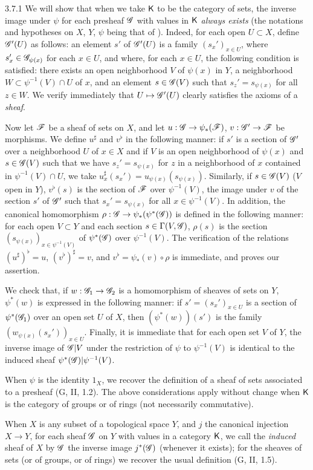 \begin{env}{3.7.1}
\label{env-0.3.7.1}
We will show that when we take $\mathsf{K}$ to be the category of sets, the inverse
image under $\psi$ for each presheaf $\mathscr{G}$ with values in $\mathsf{K}$ \emph{always
exists} (the notations and hypotheses on $X$, $Y$, $\psi$ being that of
). Indeed, for each open $U\subset X$, define $\mathscr{G}'(U)$ as
follows: an element $s'$ of $\mathscr{G}'(U)$ is a family $(s_x')_{x\in U}$, where
$s_x'\in\mathscr{G}_{\psi(x)}$ for each $x\in U$, and where, for each $x\in U$, the
following condition is satisfied: there exists an open neighborhood $V$ of
$\psi(x)$ in $Y$, a neighborhood $W\subset\psi^{-1}(V)\cap U$ of $x$, and an
element $s\in\mathscr{G}(V)$ such that $s_z'=s_{\psi(x)}$ for all $z\in W$. We verify
immediately that $U\mapsto\mathscr{G}'(U)$ clearly satisfies the axioms of a
\emph{sheaf}.

Now let $\mathscr{F}$ be a sheaf of sets on $X$, and let $u:\mathscr{G}\to\psi_*(\mathscr{F})$,
$v:\mathscr{G}'\to\mathscr{F}$ be morphisms. We define $u^\sharp$ and $v^\flat$ in the
following manner: if $s'$ is a section of $\mathscr{G}'$ over a neighborhood $U$ of
$x\in X$ and if $V$ is an open neighborhood of $\psi(x)$ and $s\in\mathscr{G}(V)$
such that we have $s_z'=s_{\psi(x)}$ for $z$ in a neighborhood of $x$ contained
in $\psi^{-1}(V)\cap U$, we take $u_x^\sharp(s_x')=u_{\psi(x)}(s_{\psi(x)})$.
Similarly, if $s\in\mathscr{G}(V)$ ($V$ open in $Y$), $v^\flat(s)$ is the section of
$\mathscr{F}$ over $\psi^{-1}(V)$, the image under $v$ of the section $s'$ of
$\mathscr{G}'$ such that $s_x'=s_{\psi(x)}$ for all $x\in\psi^{-1}(V)$. In addition,
the canonical homomorphism 
$\rho:\mathscr{G}\to\psi_*(\psi^*(\mathscr{G}))$ is defined in the following manner: for
each open $V\subset Y$ and each section $s\in\Gamma(V,\mathscr{G})$, $\rho(s)$ is the
section $(s_{\psi(x)})_{x\in\psi^{-1}(V)}$ of $\psi^*(\mathscr{G})$ over
$\psi^{-1}(V)$. The verification of the relations $(u^\sharp)^\flat=u$,
$(v^\flat)^\sharp=v$, and $v^\flat=\psi_*(v)\circ\rho$ is immediate, and proves
our assertion.

We check that, if $w:\mathscr{G}_1\to\mathscr{G}_2$ is a homomorphism of sheaves of sets
on $Y$, $\psi^*(w)$ is expressed in the following manner: if
$s'=(s_x')_{x\in U}$ is a section of $\psi^*(\mathscr{G}_1)$ over an open set $U$ of
$X$, then $(\psi^*(w))(s')$ is the family $(w_{\psi(x)}(s_x'))_{x\in U}$.
Finally, it is immediate that for each open set $V$ of $Y$, the inverse image of
$\mathscr{G}|V$ under the restriction of $\psi$ to $\psi^{-1}(V)$ is identical to the
induced sheaf $\psi^*(\mathscr{G})|\psi^{-1}(V)$.

When $\psi$ is the identity $1_X$, we recover the definition of a sheaf of sets
associated to a presheaf (G, II, 1.2). The above considerations apply without
change when $\mathsf{K}$ is the category of groups or of rings (not necessarily
commutative).

When $X$ is any subset of a topological space $Y$, and $j$ the canonical
injection $X\to Y$, for each sheaf $\mathscr{G}$ on $Y$ with values in a category
$\mathsf{K}$, we call the \emph{induced} sheaf of $X$ by $\mathscr{G}$ the inverse image
$j^*(\mathscr{G})$ (whenever it exists); for the sheaves of sets (or of groups, or of
rings) we recover the usual definition (G, II, 1.5).
\end{env}

